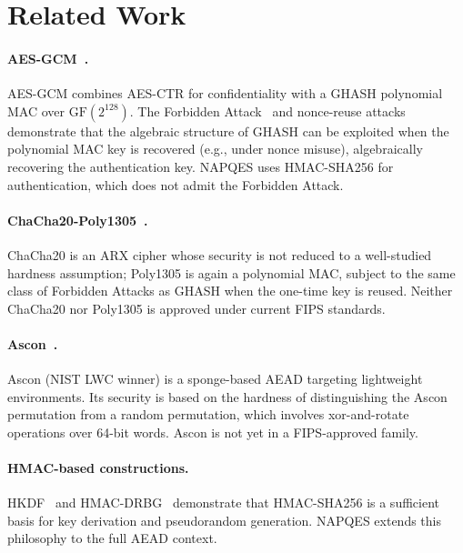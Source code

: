\documentclass[11pt,a4paper]{article}
\begin{document}
\section{Related Work}
\label{sec:related}

\paragraph{AES-GCM~\cite{nist-gcm}.}
AES-GCM combines AES-CTR for confidentiality with a GHASH polynomial MAC
over $\mathrm{GF}(2^{128})$.  The Forbidden Attack~\cite{joux2006} and
nonce-reuse attacks~\cite{joux-nonce} demonstrate that the algebraic structure
of GHASH can be exploited when the polynomial MAC key is recovered (e.g.,
under nonce misuse), algebraically recovering the authentication key.
NAPQES uses HMAC-SHA256 for authentication, which does not admit the
Forbidden Attack.

\paragraph{ChaCha20-Poly1305~\cite{rfc7539}.}
ChaCha20 is an ARX cipher whose security is not reduced to a well-studied
hardness assumption; Poly1305 is again a polynomial MAC, subject to the same
class of Forbidden Attacks as GHASH when the one-time key is reused.  Neither
ChaCha20 nor Poly1305 is approved under current FIPS standards.

\paragraph{Ascon~\cite{ascon2021}.}
Ascon (NIST LWC winner) is a sponge-based AEAD targeting lightweight
environments.  Its security is based on the hardness of distinguishing the
Ascon permutation from a random permutation, which involves xor-and-rotate
operations over 64-bit words.  Ascon is not yet in a FIPS-approved family.

\paragraph{HMAC-based constructions.}
HKDF~\cite{rfc5869} and HMAC-DRBG~\cite{nist-drbg} demonstrate that
HMAC-SHA256 is a sufficient basis for key derivation and pseudorandom
generation.  NAPQES extends this philosophy to the full AEAD context.
\end{document}
